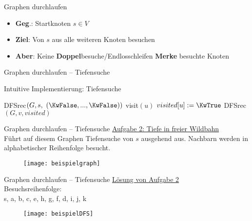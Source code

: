 \begin{frame}{Graphen durchlaufen}
	\begin{itemize}
		\item \textbf{Geg}.: Startknoten $s \in V$
		\item \textbf{Ziel}: Von $s$ aus alle weiteren Knoten besuchen
		\pause
		\item \textbf{Aber}: Keine \textbf{Doppel}besuche/Endlosschleifen \impl \textbf{Merke} besuchte Knoten
	\end{itemize}
\end{frame}

\delimitershortfall=0pt  %

\begin{frame}{Graphen durchlaufen – Tiefensuche}
	\begin{exampleblock}{Intuitive Implementierung: Tiefensuche}
		\begin{algorithm}[H]
			 {
				DFSrec$\left(G, s,\ (\KwFalse, ... , \KwFalse)\right)$\;
			}
			\;
			 {
				 {
					visit$(u)$   \;
					$visited[u] := \KwTrue$\;
					\;
					 {
						DFSrec$(G, v, visited)$\;
					}
				}
			}
		\end{algorithm}
	\end{exampleblock}
\end{frame}

\begin{frame}{Graphen durchlaufen – Tiefensuche}
	\underline{Aufgabe 2: Tiefe in freier Wildbahn} \\
	Führt auf diesem Graphen Tiefensuche von $s$ ausgehend aus. Nachbarn werden in alphabetischer Reihenfolge besucht.
	\begin{figure}[htp]
		\centering
		\texttt{[image: beispielgraph]}
	\end{figure}
\end{frame}

\begin{frame}{Graphen durchlaufen – Tiefensuche}
	\underline{Lösung von Aufgabe 2} \\
	Besuchsreihenfolge: \\ s, a, b, c, e, h, g, f, d, i, j, k
	\begin{figure}[htp]
		\centering
		\texttt{[image: beispielDFS]}
	\end{figure}
\end{frame}

